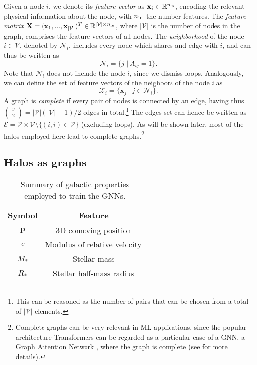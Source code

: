 \documentclass[twocolumn]{aastex631}
\begin{document}
Given a node $i$, we denote its \textit{feature vector} as $\textbf{x}_i \in \mathbb{R}^{n_{\rm in}}$, encoding the relevant physical information about the node, with $n_{\rm in}$ the number features. The \textit{feature matrix} $\textbf{X} = (\textbf{x}_1, ... , \textbf{x}_{|\mathcal{V}|})^T \in \mathbb{R}^{|\mathcal{V}|\times n_{\rm in}}$, where $|\mathcal{V}|$ is the number of nodes in the graph, comprises the feature vectors of all nodes. The \textit{neighborhood} of the node $i \in \mathcal{V}$, denoted by $\mathcal{N}_i$, includes every node which shares and edge with $i$, and can thus be written as
\begin{equation}
\mathcal{N}_i = \{ j \; | \; A_{ij}=1 \}.
\end{equation}
Note that $\mathcal{N}_i$ does not include the node $i$, since we dismiss loops. Analogously, we can define the set of feature vectors of the neighbors of the node $i$ as
\begin{equation}
    \mathcal{X}_i=\{\textbf{x}_j \; | \; j \in\mathcal{N}_i \}.
\end{equation}
A graph is \textit{complete} if every pair of nodes is connected by an edge, having thus ${|\mathcal{V}| \choose 2} = |\mathcal{V}|(|\mathcal{V}|-1)/2$ edges in total.\footnote{This can be reasoned as the number of pairs that can be chosen from a total of $|\mathcal{V}|$ elements.} The edges set can hence be written as $\mathcal{E}=\mathcal{V} \times \mathcal{V} \setminus \{(i,i) \in \mathcal{V}\}$ (excluding loops). As will be shown later, most of the halos employed here lead to complete graphs.\footnote{Complete graphs can be very relevant in ML applications, since the popular architecture Transformers \citep{2017arXiv170603762V} can be regarded as a particular case of a GNN, a Graph Attention Network \citep{velickovic2018graph}, where the graph is complete (see \citealt{2021arXiv210413478B} for more details).}


\subsection{Halos as graphs}
\label{sec:halosasgraphs}

\begin{table}
	\begin{center}
\setlength{\tabcolsep}{10pt}    \renewcommand{\arraystretch}{1.3}   \begin{tabular}{|c|c|}
			\hline
			Symbol & Feature \\
			\hline
			\hline
			 $\textbf{p}$ & 3D comoving position \\ 
			 \hline
			 $v$ & Modulus of relative velocity \\ 
			 \hline
			 $M_*$ & Stellar mass \\
			 \hline
			 $R_*$ & Stellar half-mass radius \\
			 \hline
		\end{tabular}
\end{center}
	\caption{Summary of galactic properties employed to train the GNNs.}
	\label{table:features}
\end{table}
\end{document}
